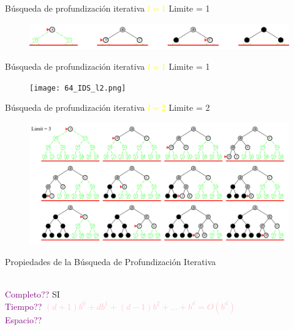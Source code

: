 \documentclass{beamer}
\theoremstyle{definition}
\theoremstyle{theorem}
\theoremstyle{remark}
\begin{document}
\begin{frame}{Búsqueda de profundización iterativa \textcolor{Yellow}{$l=1$}}
    Limite = 1
    \begin{figure}\includegraphics[width =123mm]{63_IDS_l1.png}\end{figure}
\end{frame}

\begin{frame}{Búsqueda de profundización iterativa \textcolor{Yellow}{$l=1$}}
    Limite = 1
    \begin{figure}\texttt{[image: 64\_IDS\_l2.png]}\end{figure}
\end{frame}


\begin{frame}{Búsqueda de profundización iterativa \textcolor{Yellow}{$l=2$}}
    Limite = 2
    \begin{figure}\includegraphics[width =123mm]{65_IDS_l2.png}\end{figure}
\end{frame}

\begin{frame}{Propiedades de la Búsqueda de Profundización Iterativa}
    
    \\\textcolor{purple}{Completo??} SI
    \\\textcolor{purple}{Tiempo??} \textcolor{pink}{$(d+ 1)b^0+db^1+ (d-1)b^2 + ... + b^d= O(b^d)$}
    \\\textcolor{purple}{Espacio??}
        
\end{frame}
\end{document}
